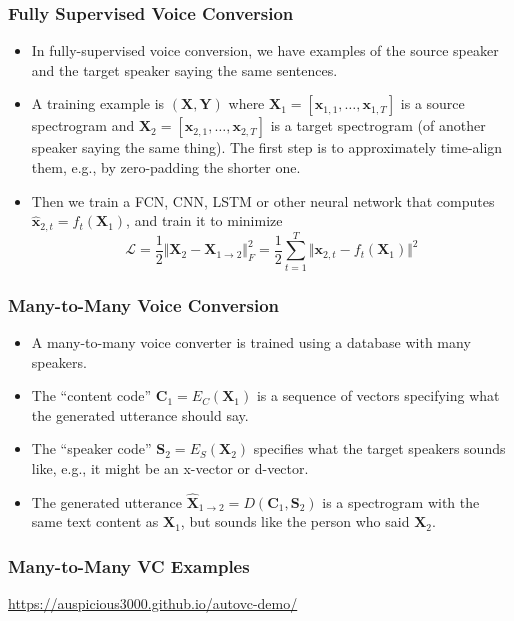 \documentclass{beamer}
\begin{document}
\begin{frame}
  \frametitle{Fully Supervised Voice Conversion}

  \begin{itemize}
    \item In fully-supervised voice conversion, we have examples of
      the source speaker and the target speaker saying the same sentences.
    \item A training example is $(\bm{X},\bm{Y})$ where
      $\bm{X}_1=[\bm{x}_{1,1},\ldots,\bm{x}_{1,T}]$ is a source
      spectrogram and $\bm{X}_2=[\bm{x}_{2,1},\ldots,\bm{x}_{2,T}]$ is
      a target spectrogram (of another speaker saying the same thing).
      The first step is to approximately time-align them, e.g., by
      zero-padding the shorter one.
    \item Then we train a FCN, CNN, LSTM or other neural network that
      computes $\hat{\bm{x}}_{2,t}=f_t(\bm{X}_1)$, and train it to minimize
      \begin{displaymath}
        \mathcal{L}=\frac{1}{2}\Vert\bm{X}_2-\bm{X}_{1\rightarrow{2}}\Vert_F^2=
        \frac{1}{2}\sum_{t=1}^T\Vert\bm{x}_{2,t}-f_t(\bm{X}_1)\Vert^2
      \end{displaymath}
  \end{itemize}
\end{frame}

\begin{frame}
  \frametitle{Many-to-Many Voice Conversion}

  \begin{itemize}
  \item A many-to-many voice converter is trained using a database
    with many speakers.
  \item The ``content code'' $\bm{C}_1=E_C(\bm{X}_1)$ is a sequence of
    vectors specifying what the generated utterance should say.
  \item The ``speaker code'' $\bm{S}_2=E_S(\bm{X}_2)$ specifies what
    the target speakers sounds like, e.g., it might be an x-vector or
    d-vector.
  \item The generated utterance $\hat{\bm{X}}_{1\rightarrow
    2}=D(\bm{C}_1,\bm{S}_2)$ is a spectrogram with the same text
    content as $\bm{X}_1$, but sounds like the person who said $\bm{X}_2$.
  \end{itemize}
\end{frame}

\begin{frame}
  \frametitle{Many-to-Many VC Examples}

  \centerline{\url{https://auspicious3000.github.io/autovc-demo/}}
\end{frame}
\end{document}
